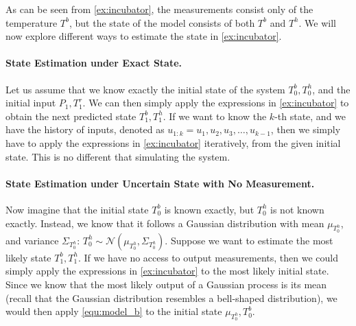 As can be seen from \cref{ex:incubator}, the measurements consist only of the temperature $T^{b}$, but the state of the model consists of both $T^{b}$ and $T^{h}$. 
We will now explore different ways to estimate the state in \cref{ex:incubator}.

\paragraph{State Estimation under Exact State.}
Let us assume that we know exactly the initial state of the system $T^{b}_0,T^{h}_0$, and the initial input $P_1, T^r_1$.
We can then simply apply the expressions in \cref{ex:incubator} to obtain the next predicted state $T^{b}_1,T^{h}_1$.
If we want to know the $k$-th state, and we have the history of inputs, denoted as $u_{1:k}=u_1,u_2,u_3,\ldots,u_{k-1}$, then we simply have to apply the expressions in \cref{ex:incubator} iteratively, from the given initial state.
This is no different that simulating the system.

\paragraph{State Estimation under Uncertain State with No Measurement.}
Now imagine that the initial state $T^{b}_0$ is known exactly, but $T^{h}_0$ is not known exactly. 
Instead, we know that it follows a Gaussian distribution with mean $\mu_{T^{h}_0}$, and variance $\Sigma_{T^{h}_0}$:
$
T^{h}_0 \sim \mathcal{N}(\mu_{T^{h}_0},\Sigma_{T^{h}_0}).
$
Suppose we want to estimate the most likely state $T^{b}_1,T^{h}_1$.
If we have no access to output measurements, then we could simply apply the expressions in \cref{ex:incubator} to the most likely initial state.
Since we know that the most likely output of a Gaussian process is its mean (recall that the Gaussian distribution resembles a bell-shaped distribution), we would then apply \cref{equ:model_b} to the initial state $\mu_{T^{h}_0},T^{b}_0$.

